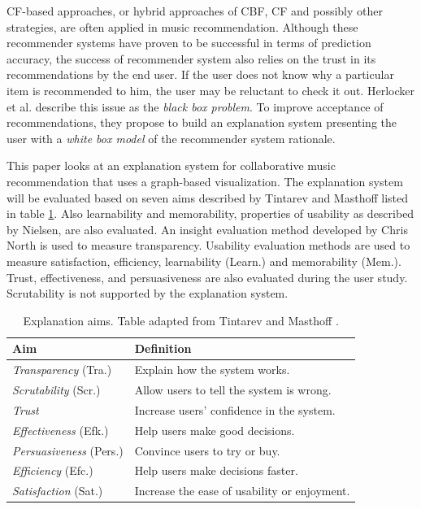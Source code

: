 \documentclass[a4paper,10pt,twocolumn]{article}
\begin{document}
CF-based approaches, or hybrid approaches of CBF, CF and possibly other strategies, are often applied in music recommendation. Although these recommender systems have proven to be successful in terms of prediction accuracy, the success of recommender system also relies on the trust in its recommendations by the end user. If the user does not know why a particular item is recommended to him, the user may be reluctant to check it out. Herlocker et al. \cite{herlocker:2000} describe this issue as the \emph{black box problem}. To improve acceptance of recommendations, they propose to build an explanation system presenting the user with a \emph{white box model} of the recommender system rationale.

This paper looks at an explanation system for collaborative music recommendation that uses a graph-based visualization. The explanation system will be evaluated based on seven aims described by Tintarev and Masthoff \cite{tintarev:2007:SER:1547550.1547664} listed in table \ref{table:explanation:aims}. Also learnability and memorability, properties of usability as described by Nielsen\cite{nielsen:1993:UE:529793}, are also evaluated. An insight evaluation method developed by Chris North \cite{north:2006} is used to measure transparency. Usability evaluation methods are used to measure satisfaction, efficiency, learnability (Learn.) and memorability (Mem.). Trust, effectiveness, and persuasiveness are also evaluated during the user study. Scrutability is not supported by the explanation system.

\begin{table}
	\caption{Explanation aims. Table adapted from Tintarev and Masthoff \cite{tintarev:2007:SER:1547550.1547664}.}
	\begin{tabular}{p{70px} | p{140px} } %
		\hline
		\textbf{Aim} 						& \textbf{Definition} \\
		\hline
		\textit{Transparency} (Tra.)		&	Explain how the system works. \\
		\textit{Scrutability}	(Scr.)		&	Allow users to tell the system is wrong. \\
		\textit{Trust}									&	Increase users' confidence in the system. \\
		\textit{Effectiveness} (Efk.)		&	Help users make good decisions. \\
		\textit{Persuasiveness}	(Pers.)	&	Convince users to try or buy. \\
		\textit{Efficiency}	(Efc.)			& Help users make decisions faster. \\
		\textit{Satisfaction} (Sat.)		& Increase the ease of usability or enjoyment. \\
		\hline
	\end{tabular}
	\label{table:explanation:aims}
\end{table}
\end{document}
